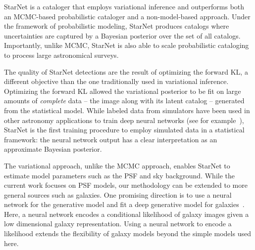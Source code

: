 StarNet is a cataloger that employs variational inference and outperforms both an MCMC-based probabilistic cataloger and a non-model-based approach. 
Under the framework of probabilistic modeling, 
StarNet produces catalogs where uncertainties are captured by a Bayesian posterior over the set of all catalogs.
Importantly, unlike MCMC, StarNet is also able to scale probabilistic cataloging to process large astronomical surveys. 

The quality of StarNet detections are the result of optimizing the forward KL, a different objective than the one traditionally used in variational inference. 
Optimizing the forward KL allowed the variational posterior to be fit on large amounts of {\itshape complete} data -- the image along with its latent catalog -- generated from the statistical model. 
While labeled data from simulators have been used in other astronomy applications to train deep neural networks (see for example~\cite{Lanusse_2017_cmudeeplens, huang2019finding}), StarNet is the first training procedure to employ simulated data in a statistical framework: the neural network output has a clear interpretation as an approximate Bayesian posterior. 


The variational approach, unlike the MCMC approach, enables StarNet to estimate model parameters such as the PSF and sky background.
While the current work focuses on PSF models, our methodology can be extended to more general sources such as galaxies.
One promising direction is to use a neural network for the generative model and fit a deep generative model for galaxies~\cite{Regier2015ADG}. 
Here, a neural network encodes a conditional likelihood of galaxy images given a low dimensional galaxy representation. 
Using a neural network to encode a likelihood extends the flexibility of galaxy models beyond the simple models used here. 

